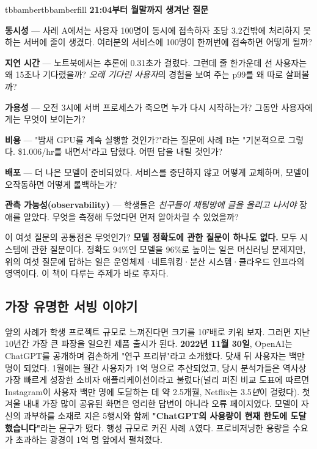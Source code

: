 \begin{calloutbox}{tbbamber}{tbbamberfill}
{\normalsize\bfseries\color{tbbamberdark}21:04부터 월말까지 생겨난 질문}\par\vspace{3pt}
\begin{tbbitemize}
  \item \textbf{동시성} — 사례 A에서는 사용자 100명이 동시에 접속하자 초당 3.2건밖에 처리하지 못하는 서버에 줄이 생겼다. 여러분의 서비스에 100명이 한꺼번에 접속하면 어떻게 될까?
  \item \textbf{지연 시간} — 노트북에서는 추론에 0.31초가 걸렸다. 그런데 줄 한가운데 선 사용자는 왜 15초나 기다렸을까? \textit{오래 기다린 사용자}의 경험을 보여 주는 p99를 왜 따로 살펴볼까?
  \item \textbf{가용성} — 오전 3시에 서버 프로세스가 죽으면 누가 다시 시작하는가? 그동안 사용자에게는 무엇이 보이는가?
  \item \textbf{비용} — "밤새 GPU를 계속 실행할 것인가?"라는 질문에 사례 B는 "기본적으로 그렇다. \$1.006/hr를 내면서"라고 답했다. 어떤 답을 내릴 것인가?
  \item \textbf{배포} — 더 나은 모델이 준비되었다. 서비스를 중단하지 않고 어떻게 교체하며, 모델이 오작동하면 어떻게 롤백하는가?
  \item \textbf{관측 가능성(observability)} — 학생들은 \textit{친구들이 채팅방에 글을 올리고 나서야} 장애를 알았다. 무엇을 측정해 두었다면 먼저 알아차릴 수 있었을까?
\end{tbbitemize}
\end{calloutbox}

\vspace{3.0pt}

이 여섯 질문의 공통점은 무엇인가? \textbf{모델 정확도에 관한 질문이 하나도 없다.} 모두 시스템에 관한 질문이다. 정확도 94\%인 모델을 96\%로 높이는 일은 머신러닝 문제지만, 위의 여섯 질문에 답하는 일은 운영체제·네트워킹·분산 시스템·클라우드 인프라의 영역이다. 이 책이 다루는 주제가 바로 후자다.

\subsection*{가장 유명한 서빙 이야기}

앞의 사례가 학생 프로젝트 규모로 느껴진다면 크기를 10⁷배로 키워 보자. 그러면 지난 10년간 가장 큰 파장을 일으킨 제품 출시가 된다. \textbf{2022년 11월 30일}, OpenAI는 ChatGPT를 공개하며 겸손하게 "연구 프리뷰"라고 소개했다. 닷새 뒤 사용자는 백만 명이 되었다. 1월에는 월간 사용자가 1억 명으로 추산되었고, 당시 분석가들은 역사상 가장 빠르게 성장한 소비자 애플리케이션이라고 불렀다(널리 퍼진 비교 도표에 따르면 Instagram이 사용자 백만 명에 도달하는 데 약 2.5개월, Netflix는 3.5\textit{년}이 걸렸다). 첫겨울 내내 가장 많이 공유된 화면은 영리한 답변이 아니라 오류 페이지였다. 모델이 자신의 과부하를 소재로 지은 5행시와 함께 \textbf{"ChatGPT의 사용량이 현재 한도에 도달했습니다"}라는 문구가 떴다. 행성 규모로 커진 사례 A였다. 프로비저닝한 용량을 수요가 초과하는 광경이 1억 명 앞에서 펼쳐졌다.


